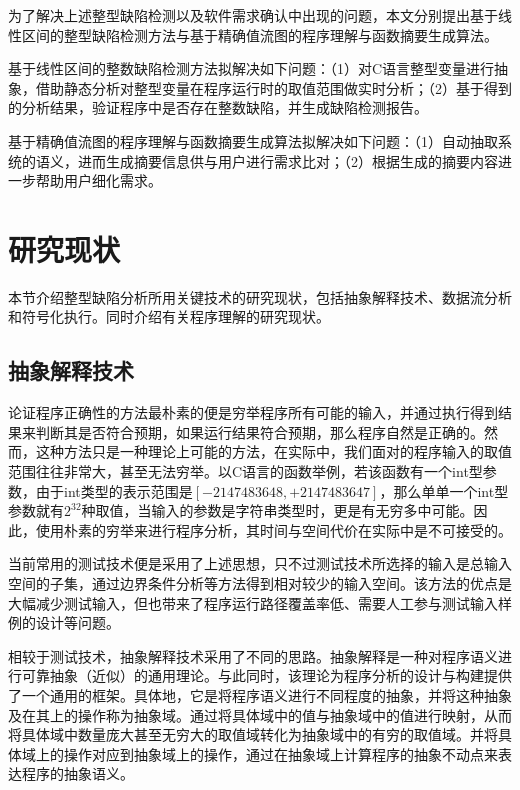为了解决上述整型缺陷检测以及软件需求确认中出现的问题，本文分别提出基于线性区间的整型缺陷检测方法与基于精确值流图的程序理解与函数摘要生成算法。

基于线性区间的整数缺陷检测方法拟解决如下问题：（1）对C语言整型变量进行抽象，借助静态分析对整型变量在程序运行时的取值范围做实时分析；（2）基于得到的分析结果，验证程序中是否存在整数缺陷，并生成缺陷检测报告。

基于精确值流图的程序理解与函数摘要生成算法拟解决如下问题：（1）自动抽取系统的语义，进而生成摘要信息供与用户进行需求比对；（2）根据生成的摘要内容进一步帮助用户细化需求。

 \section{研究现状}
 
 本节介绍整型缺陷分析所用关键技术的研究现状，包括抽象解释技术、数据流分析和符号化执行。同时介绍有关程序理解的研究现状。
 
 \subsection{抽象解释技术}
 
 论证程序正确性的方法最朴素的便是穷举程序所有可能的输入，并通过执行得到结果来判断其是否符合预期，如果运行结果符合预期，那么程序自然是正确的。然而，这种方法只是一种理论上可能的方法，在实际中，我们面对的程序输入的取值范围往往非常大，甚至无法穷举。以C语言的函数举例，若该函数有一个int型参数，由于int类型的表示范围是$ \left[  -2147483648, +2147483647 \right] $，那么单单一个int型参数就有$ 2^{32}  $种取值，当输入的参数是字符串类型时，更是有无穷多中可能。因此，使用朴素的穷举来进行程序分析，其时间与空间代价在实际中是不可接受的。
 
 当前常用的测试技术便是采用了上述思想，只不过测试技术所选择的输入是总输入空间的子集，通过边界条件分析等方法得到相对较少的输入空间。该方法的优点是大幅减少测试输入，但也带来了程序运行路径覆盖率低、需要人工参与测试输入样例的设计等问题。
 
 相较于测试技术，抽象解释技术采用了不同的思路。抽象解释是一种对程序语义进行可靠抽象（近似）的通用理论\cite{cousot1977abstract}。与此同时，该理论为程序分析的设计与构建提供了一个通用的框架\cite{cousot1979systematic}。具体地，它是将程序语义进行不同程度的抽象，并将这种抽象及在其上的操作称为抽象域。通过将具体域中的值与抽象域中的值进行映射，从而将具体域中数量庞大甚至无穷大的取值域转化为抽象域中的有穷的取值域。并将具体域上的操作对应到抽象域上的操作，通过在抽象域上计算程序的抽象不动点来表达程序的抽象语义。
 
